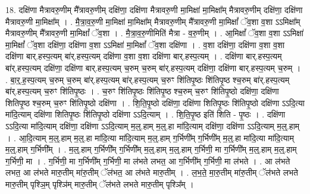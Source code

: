\documentclass[17pt]{extarticle}
\begin{document}
18. दक्षि॑णा मैत्रावरु॒णीम् मै᳚त्रावरु॒णीम् दक्षि॑णा॒ दक्षि॑णा मैत्रावरु॒णी मा॒मिक्षा॑ मा॒मिक्षा᳚म् मैत्रावरु॒णीम् दक्षि॑णा॒ दक्षि॑णा मैत्रावरु॒णी मा॒मिक्षा᳚म् । . मै॒त्रा॒व॒रु॒णी मा॒मिक्षा॑ मा॒मिक्षा᳚म् मैत्रावरु॒णीम् मै᳚त्रावरु॒णी मा॒मिक्षां᳚ ॅव॒शा व॒शा ऽऽमिक्षा᳚म् मैत्रावरु॒णीम् मै᳚त्रावरु॒णी मा॒मिक्षां᳚ ॅव॒शा । . मै॒त्रा॒व॒रु॒णीमिति॑ मैत्रा - व॒रु॒णीम् । . आ॒मिक्षां᳚ ॅव॒शा व॒शा ऽऽमिक्षा॑ मा॒मिक्षां᳚ ॅव॒शा दक्षि॑णा॒ दक्षि॑णा व॒शा ऽऽमिक्षा॑ मा॒मिक्षां᳚ ॅव॒शा दक्षि॑णा । . व॒शा दक्षि॑णा॒ दक्षि॑णा व॒शा व॒शा दक्षि॑णा बार्.हस्प॒त्यम् बा॑र्.हस्प॒त्यम् दक्षि॑णा व॒शा व॒शा दक्षि॑णा बार्.हस्प॒त्यम् । . दक्षि॑णा बार्.हस्प॒त्यम् बा॑र्.हस्प॒त्यम् दक्षि॑णा॒ दक्षि॑णा बार्.हस्प॒त्यम् च॒रुम् च॒रुम् बा॑र्.हस्प॒त्यम् दक्षि॑णा॒ दक्षि॑णा बार्.हस्प॒त्यम् च॒रुम् । . बा॒र्॒.ह॒स्प॒त्यम् च॒रुम् च॒रुम् बा॑र्.हस्प॒त्यम् बा॑र्.हस्प॒त्यम् च॒रुꣳ शि॑तिपृ॒ष्ठः शि॑तिपृ॒ष्ठ श्च॒रुम् बा॑र्.हस्प॒त्यम् बा॑र्.हस्प॒त्यम् च॒रुꣳ शि॑तिपृ॒ष्ठः । . च॒रुꣳ शि॑तिपृ॒ष्ठः शि॑तिपृ॒ष्ठ श्च॒रुम् च॒रुꣳ शि॑तिपृ॒ष्ठो दक्षि॑णा॒ दक्षि॑णा शितिपृ॒ष्ठ श्च॒रुम् च॒रुꣳ शि॑तिपृ॒ष्ठो दक्षि॑णा । . शि॒ति॒पृ॒ष्ठो दक्षि॑णा॒ दक्षि॑णा शितिपृ॒ष्ठः शि॑तिपृ॒ष्ठो दक्षि॑णा ऽऽदि॒त्या मा॑दि॒त्याम् दक्षि॑णा शितिपृ॒ष्ठः शि॑तिपृ॒ष्ठो दक्षि॑णा ऽऽदि॒त्याम् । . शि॒ति॒पृ॒ष्ठ इति॑ शिति - पृ॒ष्ठः । . दक्षि॑णा ऽऽदि॒त्या मा॑दि॒त्याम् दक्षि॑णा॒ दक्षि॑णा ऽऽदि॒त्याम् म॒ल्॒.हाम् म॒ल्॒.हा मा॑दि॒त्याम् दक्षि॑णा॒ दक्षि॑णा ऽऽदि॒त्याम् म॒ल्॒.हाम् । . आ॒दि॒त्याम् म॒ल्॒.हाम् म॒ल्॒.हा मा॑दि॒त्या मा॑दि॒त्याम् म॒ल्॒.हाम् ग॒र्भिणी᳚म् ग॒र्भिणी᳚म् म॒ल्॒.हा मा॑दि॒त्या मा॑दि॒त्याम् म॒ल्॒.हाम् ग॒र्भिणी᳚म् । . म॒ल्॒.हाम् ग॒र्भिणी᳚म् ग॒र्भिणी᳚म् म॒ल्॒.हाम् म॒ल्॒.हाम् ग॒र्भिणी॒ मा ग॒र्भिणी᳚म् म॒ल्॒.हाम् म॒ल्॒.हाम् ग॒र्भिणी॒ मा । . ग॒र्भिणी॒ मा ग॒र्भिणी᳚म् ग॒र्भिणी॒ मा ल॑भते लभत॒ आ ग॒र्भिणी᳚म् ग॒र्भिणी॒ मा ल॑भते । . आ ल॑भते लभत॒ आ ल॑भते मारु॒तीम् मा॑रु॒तीम् ॅल॑भत॒ आ ल॑भते मारु॒तीम् । . ल॒भ॒ते॒ मा॒रु॒तीम् मा॑रु॒तीम् ॅल॑भते लभते मारु॒तीम् पृश्ञि॒म् पृश्ञि॑म् मारु॒तीम् ॅल॑भते लभते मारु॒तीम् पृश्ञि᳚म् । \newline
\end{document}
